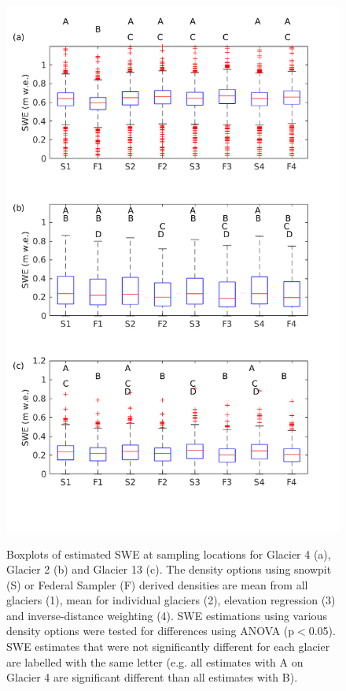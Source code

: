 \documentclass{sfuthesis}
\begin{document}
\begin{figure}[H]
	\centering
	\includegraphics[height = 0.8\textheight]{AllSWEopts_boxplot.png}\\
	\caption{Boxplots of estimated SWE at sampling locations for Glacier 4 (a), Glacier 2 (b) and Glacier 13 (c). The density options using snowpit (S) or Federal Sampler (F) derived densities are mean from all glaciers (1), mean for individual glaciers (2), elevation regression (3) and inverse-distance weighting (4). SWE estimations using various density options were tested for differences using ANOVA (p$<$0.05). SWE estimates that were not significantly different for each glacier are labelled with the same letter (e.g. all estimates with A on Glacier 4 are significant different than all estimates with B).}
	\label{fig:AllSWEopts_boxplot}
\end{figure}
\end{document}
